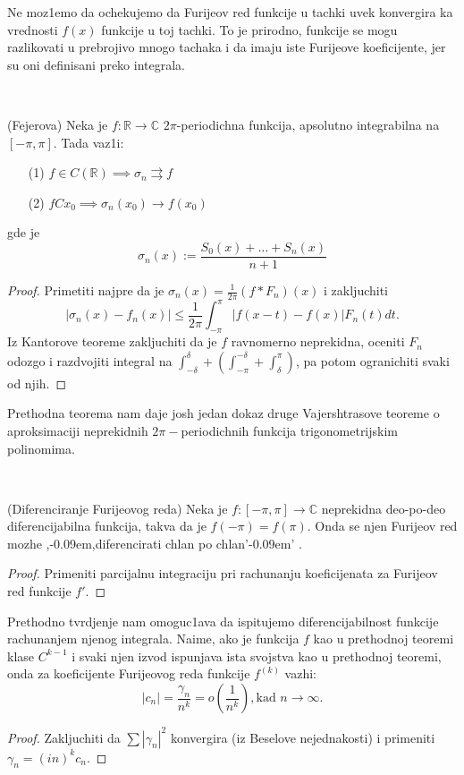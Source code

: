 \documentclass[a4paper,12pt]{article}
\newcommand{\RR}{\mathbb{R}}
\newcommand{\CC}{\mathbb{C}}
\def\zn{,\kern-0.09em,} %
\def\zng{'\kern-0.09em' } %
\begin{document}
\begin{nap}
Ne moz1emo da ochekujemo da Furijeov red funkcije u tachki uvek konvergira ka vrednosti $f(x)$ funkcije u toj tachki. To je prirodno,
funkcije se mogu razlikovati u prebrojivo mnogo tachaka i da imaju iste Furijeove koeficijente, jer su oni definisani preko integrala.
\end{nap}\\

\begin{tma}
(Fejerova) Neka je $f: \RR \to \CC$ $2 \pi$-periodichna funkcija, apsolutno integra\-bilna na $[-\pi, \pi]$. Tada vaz1i:
\begin{itemize}
\item[(1)] $f \in C(\RR) \implies \sigma_n \rightrightarrows f$
\item[(2)] $fCx_0 \implies \sigma_n(x_0) \to f(x_0)$
\end{itemize}
gde je \[\sigma_n(x):= \frac{S_0(x) + \dots + S_n(x)}{n+1}\]
\end{tma}

\begin{proof}
	Primetiti najpre da je $\sigma_n(x) = \frac{1}{2\pi} (f*F_n)(x)$ i zakljuchiti
	\[ |\sigma_n(x) - f_n(x)| \leq \frac{1}{2\pi} \int_{-\pi}^\pi |f(x-t) - f(x)|F_n(t)dt .\] 
	Iz Kantorove teoreme zakljuchiti da je $f$ ravnomerno neprekidna, oceniti $F_n$ odozgo i razdvojiti integral na 
	$\int_{-\delta}^\delta + (\int_{-\pi}^{-\delta} + \int_{\delta}^{\pi})$, pa potom ogranichiti svaki od njih.
\end{proof}

\begin{nap}
	Prethodna teorema nam daje josh jedan dokaz druge Vajershtrasove teoreme o aproksimaciji neprekidnih $ 2\pi-$periodichnih
	funkcija trigonometrijskim polinomima.
\end{nap}\\

\begin{tvr}(Diferenciranje Furijeovog reda)
	Neka je $f:[-\pi, \pi] \to \CC$ neprekidna deo-po-deo diferencijabilna funkcija, takva da je $f(-\pi) = f(\pi)$.
	Onda se njen Furijeov red mozhe \zn diferencirati chlan po chlan\zng.
\end{tvr}
\begin{proof}
	Primeniti parcijalnu integraciju pri rachunanju koeficijenata za Furijeov red funkcije $f'$.
\end{proof}

\begin{posl}
	Prethodno tvrdjenje nam omoguc1ava da ispitujemo diferencijabilnost fun\-kcije rachunanjem njenog integrala. Naime,
	ako je funkcija $f$ kao u prethodnoj teoremi klase $C^{k-1}$ i svaki njen izvod ispunjava ista svojstva kao u 
	prethodnoj teoremi, onda za koeficijente Furijeovog reda funkcije $f^{(k)}$ vazhi:
	\[ |c_n| = \frac{\gamma_n}{n^k} = o\left(\frac{1}{n^k}\right), \text{kad }n\to \infty .\] 
\end{posl}
\begin{proof}
	Zakljuchiti da $\sum |\gamma_n|^2$ konvergira (iz Beselove nejednakosti) i primeniti $\gamma_n = (in)^k c_n$.
\end{proof}
\end{document}
